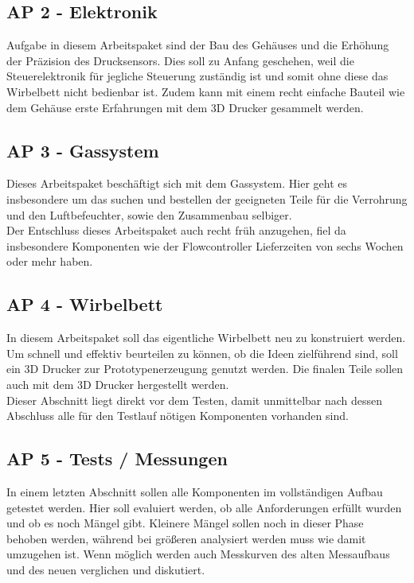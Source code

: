 \subsection{AP 2 - Elektronik}

Aufgabe in diesem Arbeitspaket sind der Bau des Gehäuses und die Erhöhung der Präzision des Drucksensors. Dies soll zu Anfang geschehen, weil die Steuerelektronik für jegliche Steuerung zuständig ist und somit ohne diese das Wirbelbett nicht bedienbar ist. Zudem kann mit einem recht einfache Bauteil wie dem Gehäuse erste Erfahrungen mit dem 3D Drucker gesammelt werden.

\subsection{AP 3 - Gassystem}

Dieses Arbeitspaket beschäftigt sich mit dem Gassystem. Hier geht es insbesondere um das suchen und bestellen der geeigneten Teile für die Verrohrung und den Luftbefeuchter, sowie den Zusammenbau selbiger. \\
Der Entschluss dieses Arbeitspaket auch recht früh anzugehen, fiel da insbesondere Komponenten wie der Flowcontroller Lieferzeiten von sechs Wochen oder mehr haben. 

\subsection{AP 4 - Wirbelbett}

In diesem Arbeitspaket soll das eigentliche Wirbelbett neu zu konstruiert werden. Um schnell und effektiv beurteilen zu können, ob die Ideen zielführend sind, soll ein 3D Drucker zur Prototypenerzeugung genutzt werden. Die finalen Teile sollen auch mit dem 3D Drucker hergestellt werden. \\
Dieser Abschnitt liegt direkt vor dem Testen, damit unmittelbar nach dessen Abschluss alle für den Testlauf nötigen Komponenten vorhanden sind.


\subsection{AP 5 - Tests / Messungen}

In einem letzten Abschnitt sollen alle Komponenten im vollständigen Aufbau getestet werden. Hier soll evaluiert werden, ob alle Anforderungen erfüllt wurden und ob es noch Mängel gibt. Kleinere Mängel sollen noch in dieser Phase behoben werden, während bei größeren analysiert werden muss wie damit umzugehen ist. Wenn möglich werden auch Messkurven des alten Messaufbaus und des neuen verglichen und diskutiert.


